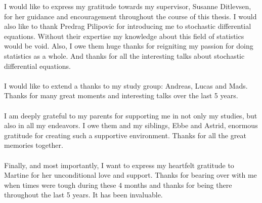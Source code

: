I would like to express my gratitude towards my supervisor, Susanne Ditlevsen, for her guidance and encouragement throughout the course of this thesis. I would also like to thank Predrag Pilipovic for introducing me to stochastic differential equations. Without their expertise my knowledge about this field of statistics would be void. Also, I owe them huge thanks for reigniting my passion for doing statistics as a whole. And thanks for all the interesting talks about stochastic differential equations.\\\\
I would like to extend a thanks to my study group: Andreas, Lucas and Mads. Thanks for many great moments and interesting talks over the last 5 years. \\\\
I am deeply grateful to my parents for supporting me in not only my studies, but also in all my endeavors. I owe them and my siblings, Ebbe and Astrid, enormous gratitude for creating such a supportive environment. Thanks for all the great memories together.\\\\
Finally, and most importantly, I want to express my heartfelt gratitude to Martine for her unconditional love and support. Thanks for bearing over with me when times were tough during these 4 months and thanks for being there throughout the last 5 years. It has been invaluable. 